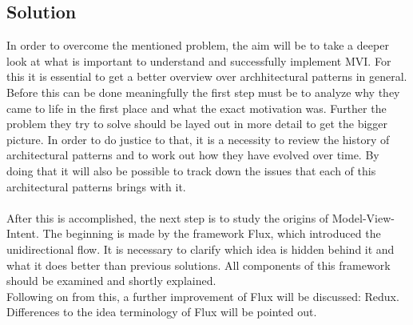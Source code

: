 \subsection{Solution}
\label{subsec:solution}



\newpage
In order to overcome the mentioned problem, the aim will be to take a deeper look at what is important to understand and successfully implement MVI.
For this it is essential to get a better overview over archhitectural patterns in general. Before this can be done meaningfully the first step must be 
to analyze why they came to life in the first place and what the exact motivation was. Further the problem they try to solve should be layed out in more detail to 
get the bigger picture. In order to do justice to that, it is a necessity to review the history of architectural patterns and to work out how they have evolved over time.
By doing that it will also be possible to track down the issues that each of this architectural patterns brings with it.
\\
\\
After this is accomplished, the next step is to study the origins of Model-View-Intent. The beginning is made by the framework Flux, which introduced the unidirectional flow. 
It is necessary to clarify which idea is hidden behind it and what it does better than previous solutions. All components of this framework should be examined and shortly explained.
\\ 
Following on from this, a further improvement of Flux will be discussed: Redux. Differences to the idea terminology of Flux will be pointed out.
\newpage





































